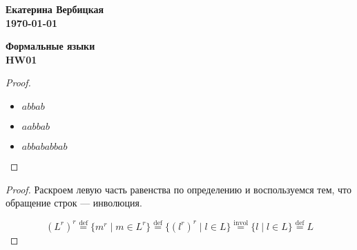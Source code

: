 \documentclass[12pt,a4paper]{article}%
\newcommand{\abovemath}[2]{\ensuremath{\stackrel{\text{#1}}{#2}}}
\newcommand{\aboveeq}[1]{\abovemath{#1}{=}}
\newcommand\bydef{\aboveeq{def}}
\begin{document}
\begin{flushright}
\textbf{Екатерина Вербицкая \\
\today}
\end{flushright}

\begin{center}
\textbf{Формальные языки\\
HW01} \\
\end{center}


\begin{proof} \hfill %
\begin{itemize}
  \item $abbab$
  \item $aabbab$
  \item $abbababbab$
\end{itemize}
\end{proof}


\begin{proof}{}
  Раскроем левую часть равенства по определению и воспользуемся тем, что обращение строк --- инволюция.

  \[
    (L^r)^r \bydef \{ m^r \mid m \in L^r\} \bydef \{ (l^r)^r \mid l \in L\} \aboveeq{invol} \{ l \mid l \in L\} \bydef L
  \]
\end{proof}

\end{document}
